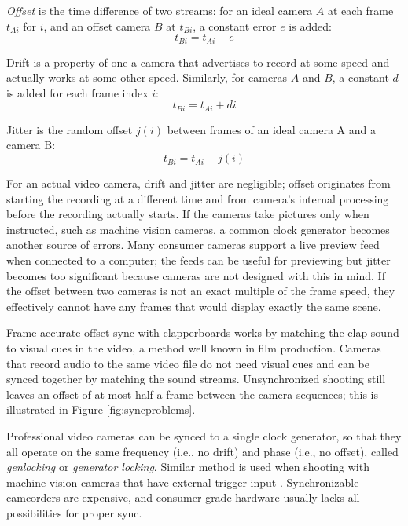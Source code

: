 \emph{Offset} is the time difference of two streams: for an ideal camera $A$ at each frame $t_{Ai}$ for $i$, and an offset camera $B$ at $t_{Bi}$, a constant error $e$ is added:
\begin{equation} \label{eq:timeoffset}
	t_{Bi} = t_{Ai} + e
\end{equation}

Drift is a property of one a camera that advertises to record at some speed and actually works at some other speed.
Similarly, for cameras $A$ and $B$, a constant $d$ is added for each frame index $i$:
\begin{equation} \label{eq:timedrift}
	t_{Bi} = t_{Ai} + d i
\end{equation}

Jitter is the random offset $j(i)$ between frames of an ideal camera A and a camera B:
\begin{equation} \label{eq:timejitter}
	t_{Bi} = t_{Ai} + j(i)
\end{equation}

For an actual video camera, drift and jitter are negligible; offset originates from starting the recording at a different time and from camera's internal processing before the recording actually starts.
If the cameras take pictures only when instructed, such as machine vision cameras, a common clock generator becomes another source of errors.
Many consumer cameras support a live preview feed when connected to a computer; the feeds can be useful for previewing but jitter becomes too significant because cameras are not designed with this in mind.
If the offset between two cameras is not an exact multiple of the frame speed, they effectively cannot have any frames that would display exactly the same scene.

Frame accurate offset sync with clapperboards works by matching the clap sound to visual cues in the video, a method well known in film production.
Cameras that record audio to the same video file do not need visual cues and can be synced together by matching the sound streams.
Unsynchronized shooting still leaves an offset of at most half a frame between the camera sequences; this is illustrated in Figure \ref{fig:syncproblems}.

Professional video cameras can be synced to a single clock generator, so that they all operate on the same frequency (i.e., no drift) and phase (i.e., no offset), called \emph{genlocking} or \emph{generator locking}.
Similar method is used when shooting with machine vision cameras that have external trigger input \cite{poynton1996technical}.
Synchronizable camcorders are expensive, and consumer-grade hardware usually lacks all possibilities for proper sync.

